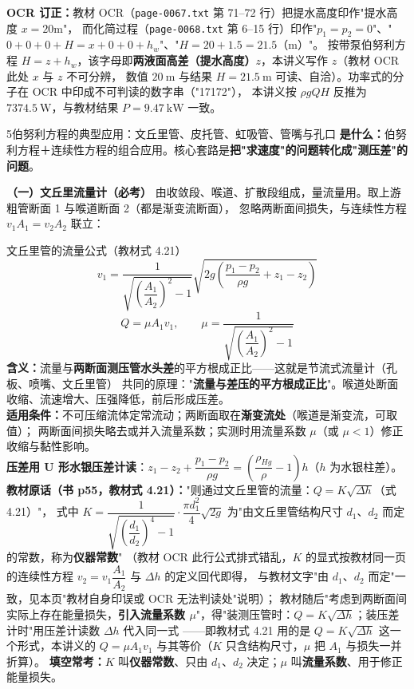 \begin{tishi}
\textbf{OCR 订正：}教材 OCR（\texttt{page-0067.txt} 第 71--72 行）把提水高度印作"提水高度 $x=20$m"，
而化简过程（\texttt{page-0068.txt} 第 6--15 行）印作"$p_1=p_2=0$"、"$0+0+0+H=x+0+0+h_w$"、"$H=20+1.5=21.5$（m）"。
按带泵伯努利方程 $H=z+h_w$，该字母即\textbf{两液面高差（提水高度）$z$}，本讲义写作 $z$（教材 OCR 此处 $x$ 与 $z$ 不可分辨，
数值 $20\ \mathrm{m}$ 与结果 $H=21.5\ \mathrm{m}$ 可读、自洽）。功率式的分子在 OCR 中印成不可判读的数字串（"17172"），
本讲义按 $\rho gQH$ 反推为 $7374.5\ \mathrm{W}$，与教材结果 $P=9.47\ \mathrm{kW}$ 一致。
\end{tishi}

\begin{kaodian}{5}{伯努利方程的典型应用：文丘里管、皮托管、虹吸管、管嘴与孔口}
\textbf{是什么：}伯努利方程＋连续性方程的组合应用。核心套路是\textbf{把"求速度"的问题转化成"测压差"的问题}。

\textbf{（一）文丘里流量计（必考）}
由收敛段、喉道、扩散段组成，量流量用。取上游粗管断面 1 与喉道断面 2（都是渐变流断面），
忽略两断面间损失，与连续性方程 $v_1A_1=v_2A_2$ 联立：
\begin{gongshi}{文丘里管的流量公式（教材式 4.21）}
\[ v_1=\frac{1}{\sqrt{\left(\dfrac{A_1}{A_2}\right)^2-1}}\sqrt{2g\!\left(\frac{p_1-p_2}{\rho g}+z_1-z_2\right)} \]
\[ Q=\mu A_1 v_1,\qquad \mu=\frac{1}{\sqrt{\left(\dfrac{A_1}{A_2}\right)^2-1}} \]
\textbf{含义：}流量与\textbf{两断面测压管水头差}的平方根成正比——这就是节流式流量计（孔板、喷嘴、文丘里管）
共同的原理："\textbf{流量与差压的平方根成正比}"。喉道处断面收缩、流速增大、压强降低，前后形成压差。\\
\textbf{适用条件：}不可压缩流体定常流动；两断面取在\textbf{渐变流处}（喉道是渐变流，可取值）；
两断面间损失略去或并入流量系数；实测时用流量系数 $\mu$（或 $\mu<1$）修正收缩与黏性影响。\\
\textbf{压差用 U 形水银压差计读}：$z_1-z_2+\dfrac{p_1-p_2}{\rho g}=\left(\dfrac{\rho_{Hg}}{\rho}-1\right)h$（$h$ 为水银柱差）。\\
\textbf{教材原话（书 p55，\textbf{教材式 4.21}）：}"则通过文丘里管的流量：$Q=K\sqrt{\Delta h}$（式 4.21）"，
式中 $K=\dfrac{1}{\sqrt{\left(\dfrac{d_1}{d_2}\right)^4-1}}\cdot\dfrac{\pi d_1^2}{4}\sqrt{2g}$ 为"由文丘里管结构尺寸 $d_1$、$d_2$ 而定的常数，称为\textbf{仪器常数}"
（教材 OCR 此行公式排式错乱，$K$ 的显式按教材同一页的连续性方程 $v_2=v_1\dfrac{A_1}{A_2}$ 与 $\Delta h$ 的定义回代即得，
与教材文字"由 $d_1$、$d_2$ 而定"一致，见本页"教材自身印误或 OCR 无法判读处"说明）；
教材随后"考虑到两断面间实际上存在能量损失，\textbf{引入流量系数 $\mu$}"，得"装测压管时：$Q=K\sqrt{\Delta h}$；装压差计时"用压差计读数 $\Delta h$ 代入同一式
——即教材式 4.21 用的是 $Q=K\sqrt{\Delta h}$ 这一个形式，本讲义的 $Q=\mu A_1v_1$ 与其等价（$K$ 只含结构尺寸，$\mu$ 把 $A_1$ 与损失一并折算）。
\textbf{填空常考：}$K$ 叫\textbf{仪器常数}、只由 $d_1$、$d_2$ 决定；$\mu$ 叫\textbf{流量系数}、用于修正能量损失。
\end{gongshi}


\end{kaodian}
